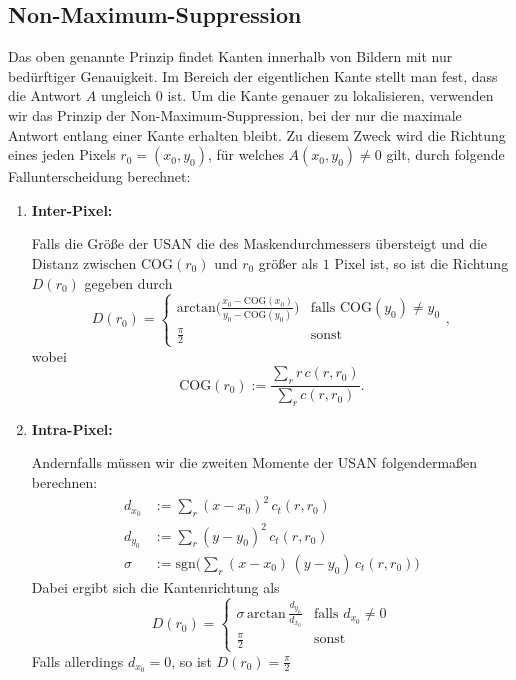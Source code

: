 \documentclass[a4paper, 11pt]{report}
\theoremstyle{definition}
\begin{document}
		\subsection{Non-Maximum-Suppression}\label{ssec:nonmax}
			Das oben genannte Prinzip findet Kanten innerhalb von Bildern mit nur bedürftiger Genauigkeit. Im Bereich der eigentlichen Kante stellt man fest, dass die Antwort $A$ ungleich $0$ ist.
			Um die Kante genauer zu lokalisieren, verwenden wir das Prinzip der Non-Maximum-Suppression, bei der nur die maximale Antwort entlang einer Kante erhalten bleibt.
			Zu diesem Zweck wird die Richtung eines jeden Pixels $r_0 = (x_0, y_0)$, für welches $A(x_0, y_0) \neq 0$ gilt, durch folgende Fallunterscheidung berechnet:
			\begin{enumerate}
				\item \textbf{Inter-Pixel:}

				\noindent Falls die Größe der USAN die des Maskendurchmessers übersteigt und die Distanz zwischen $\text{COG}(r_0)$ und $r_0$ größer als $1$ Pixel ist, so ist die Richtung $D(r_0)$ gegeben durch
				$$ D(r_0) = \begin{cases}
					\text{arctan}\bigg(
						\frac{x_0 - \text{COG}(x_0)}
						{y_0 - \text{COG}(y_0)}
					\bigg) & \text{falls } \text{COG}(y_0) \neq y_0 \\
					
					\frac{\pi}{2} & \text{sonst}

				\end{cases}, $$
				wobei
				$$ \text{COG}(r_0) := \frac	{\sum_r r\,c(r,r_0)}	{\sum_r c(r,r_0)}. $$
				\item \textbf{Intra-Pixel:}
				
				\noindent Andernfalls müssen wir die zweiten Momente der USAN folgendermaßen berechnen:
				\begin{align*}
					d_{x_0} &:= \sum_r (x-x_0)^2 \, c_t(r,r_0) \\
					d_{y_0} &:= \sum_r (y-y_0)^2 \, c_t(r,r_0) \\
					\sigma 	&:= \text{sgn}\bigg(\sum_r (x-x_0) \, (y-y_0) \, c_t(r,r_0)\bigg)
				\end{align*}
				Dabei ergibt sich die Kantenrichtung als
				$$ D(r_0) = \begin{cases}
						\sigma \, \text{arctan} \, \frac{d_{y_0}}{d_{x_0}} 	&	\text{falls } d_{x_0} \neq 0 \\ 
						\frac{\pi}{2}										&	\text{sonst}
					\end{cases}$$
				Falls allerdings $d_{x_0} = 0$, so ist $D(r_0) = \frac{\pi}{2}$
			\end{enumerate}
\end{document}
